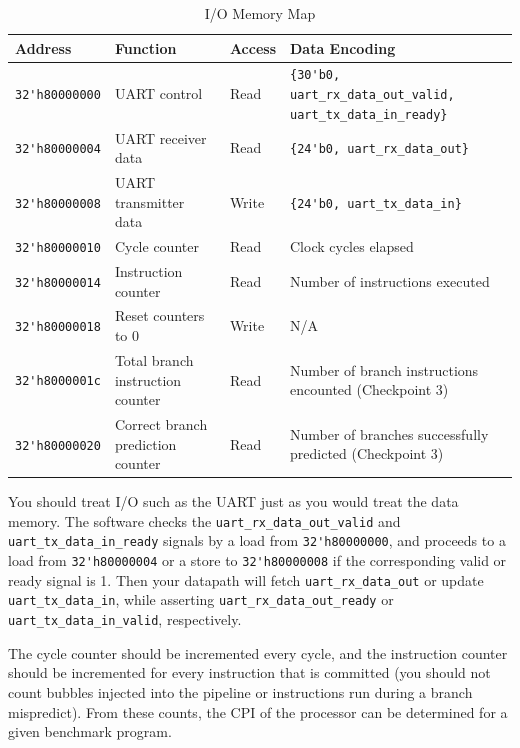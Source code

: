\begin{table}[hbt]
  \begin{center}
    \caption{I/O Memory Map}
    \label{fig:mem_map}
    \begin{adjustbox}{width=\columnwidth,center}
    \begin{tabular}{l l l l}
      \toprule
      \textbf{Address} & \textbf{Function} & \textbf{Access} & \textbf{Data Encoding}\\
      \midrule
      \verb|32'h80000000| & UART control & Read & \verb|{30'b0, uart_rx_data_out_valid, uart_tx_data_in_ready}| \\
      \verb|32'h80000004| & UART receiver data & Read & \verb|{24'b0, uart_rx_data_out}| \\
      \verb|32'h80000008| & UART transmitter data & Write & \verb|{24'b0, uart_tx_data_in}| \\
      \midrule
      \verb|32'h80000010| & Cycle counter & Read & Clock cycles elapsed \\
      \verb|32'h80000014| & Instruction counter & Read & Number of instructions executed \\
      \verb|32'h80000018| & Reset counters to 0 & Write & N/A \\
      \verb|32'h8000001c| & Total branch instruction 
 counter & Read & Number of branch instructions 
 encounted (Checkpoint 3) \\
      \verb|32'h80000020| & Correct branch prediction counter & Read & Number of branches successfully predicted (Checkpoint 3)  \\
      \bottomrule
    \end{tabular}
    \end{adjustbox}
  \end{center}
\end{table}

You should treat I/O such as the UART just as you would treat the data memory.
The software checks the \verb|uart_rx_data_out_valid| and \verb|uart_tx_data_in_ready| signals by a load from \verb|32'h80000000|, and proceeds to a load from \verb|32'h80000004| or a store to \verb|32'h80000008| if the corresponding valid or ready signal is 1. Then your datapath will fetch \verb|uart_rx_data_out| or update \verb|uart_tx_data_in|, while asserting \verb|uart_rx_data_out_ready| or \verb|uart_tx_data_in_valid|, respectively.

The cycle counter should be incremented every cycle, and the instruction counter should be incremented for every instruction that is committed (you should not count bubbles injected into the pipeline or instructions run during a branch mispredict).
From these counts, the CPI of the processor can be determined for a given benchmark program.

\newpage
